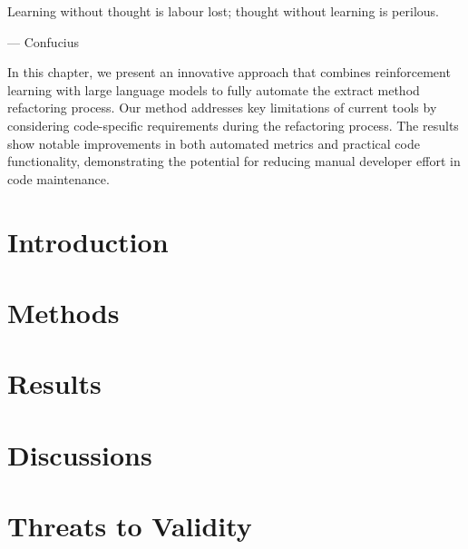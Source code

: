 \epigraph{Learning without thought is labour lost; thought without learning is perilous.}{--- \textup{Confucius}}

In this chapter, we present an innovative approach that combines reinforcement learning with large language models to fully automate the extract method refactoring process. Our method addresses key limitations of current tools by considering code-specific requirements during the refactoring process. The results show notable improvements in both automated metrics and practical code functionality, demonstrating the potential for reducing manual developer effort in code maintenance.


\section{Introduction}


% 

\section{Methods}


\section{Results}


\section{Discussions}


% 

\section{Threats to Validity}
